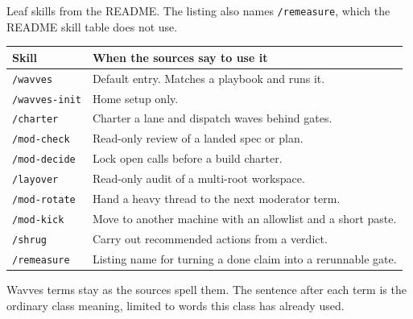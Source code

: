 \documentclass[10pt]{article}
\newcommand{\sect}[1]{%
  \par\addvspace{0.75em}%
  \noindent{\normalsize\bfseries #1}\par\nopagebreak
  \addvspace{0.2em}%
  \noindent\ignorespaces
}
\begin{document}
\noindent Leaf skills from the README. The listing also names \texttt{/remeasure}, which the README skill table does not use.

\begin{center}
\small
\begin{tabular}{@{}ll@{}}
\hline
\rowcolor{tabhead}
Skill & When the sources say to use it \\
\hline
\texttt{/wavves} & Default entry. Matches a playbook and runs it. \\
\texttt{/wavves-init} & Home setup only. \\
\texttt{/charter} & Charter a lane and dispatch waves behind gates. \\
\texttt{/mod-check} & Read-only review of a landed spec or plan. \\
\texttt{/mod-decide} & Lock open calls before a build charter. \\
\texttt{/layover} & Read-only audit of a multi-root workspace. \\
\texttt{/mod-rotate} & Hand a heavy thread to the next moderator term. \\
\texttt{/mod-kick} & Move to another machine with an allowlist and a short paste. \\
\texttt{/shrug} & Carry out recommended actions from a verdict. \\
\texttt{/remeasure} & Listing name for turning a done claim into a rerunnable gate. \\
\hline
\end{tabular}
\end{center}

\clearpage
\sect{Glossary}

Wavves terms stay as the sources spell them. The sentence after each term is the ordinary class meaning, limited to words this class has already used.
\end{document}
